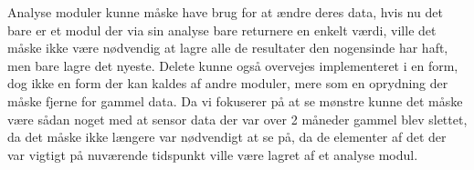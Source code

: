 Analyse moduler kunne måske have brug for at ændre deres data, hvis nu det bare er et modul der via sin analyse bare returnere en enkelt værdi, ville det måske ikke være nødvendig at lagre alle de resultater den nogensinde har haft, men bare lagre det nyeste.
Delete kunne også overvejes implementeret i en form, dog ikke en form der kan kaldes af andre moduler, mere som en oprydning der måske fjerne for gammel data. Da vi fokuserer på at se mønstre kunne det måske være sådan noget med at sensor data der var over 2 måneder gammel blev slettet, da det måske ikke længere var nødvendigt at se på, da de elementer af det der var vigtigt på nuværende tidspunkt ville være lagret af et analyse modul.